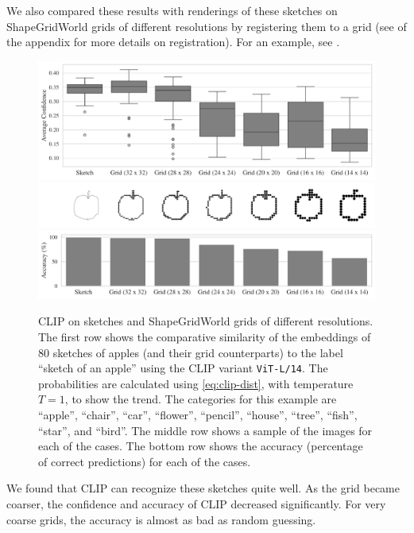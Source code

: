 We also compared these results with renderings of these sketches on ShapeGridWorld grids of different resolutions by registering them to a grid (see  of the appendix for more details on registration).
For an example, see .
\begin{figure}[h]
    \centering
    \includegraphics[width=\textwidth]{images/grid_comparison.pdf}
    \includegraphics[width=\textwidth]{images/grid_comparison_images.png}
    \includegraphics[width=\textwidth]{images/grid_comparison_accuracy.pdf}
    \caption[CLIP on sketches and ShapeGridWorld grids of different resolutions.]{CLIP on sketches and ShapeGridWorld grids of different resolutions.
    The first row shows the comparative similarity of the embeddings of \(80\) sketches of apples (and their grid counterparts) to the label ``sketch of an apple'' using the CLIP variant \texttt{ViT-L/14}.
    The probabilities are calculated using \eqref{eq:clip-dist}, with temperature \(T = 1\), to show the trend.
    The categories for this example are ``apple'', ``chair'', ``car'', ``flower'', ``pencil'', ``house'', ``tree'', ``fish'', ``star'', and ``bird''.
    The middle row shows a sample of the images for each of the cases.
    The bottom row shows the accuracy (percentage of correct predictions) for each of the cases.
    }
    \label{fig:clip-sketches}
\end{figure}
We found that CLIP can recognize these sketches quite well.
As the grid became coarser, the confidence and accuracy of CLIP decreased significantly.
For very coarse grids, the accuracy is almost as bad as random guessing.

